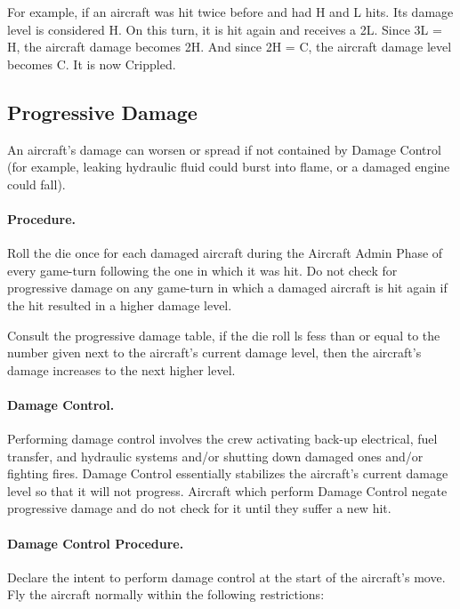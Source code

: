 For example, if an aircraft was hit twice before and had H and L hits. Its damage level is considered H. On this turn, it is hit again and receives a 2L. Since 3L = H, the aircraft damage becomes 2H. And since 2H = C, the aircraft damage level becomes C. It is now Crippled.


\advancedrules

\subsection{Progressive Damage}

An aircraft's damage can worsen or spread if not contained by Damage Control (for example, leaking hydraulic fluid could burst into flame, or a damaged engine could fall).

\paragraph{Procedure.} Roll the die once for each damaged aircraft during the Aircraft Admin Phase of every game-turn following the one in which it was hit. Do not check for progressive damage on any game-turn in which a damaged aircraft is hit again if the hit resulted in a higher damage level.

Consult the progressive damage table, if the die roll ls fess than or equal to the number given next to the aircraft's current damage level, then the aircraft's damage increases to the next higher level.

\paragraph{Damage Control.} Performing damage control involves the crew activating back-up electrical, fuel transfer, and hydraulic systems and/or shutting down damaged ones and/or fighting fires. Damage Control essentially stabilizes the aircraft's current damage level so that it will not progress. Aircraft which perform Damage Control negate progressive damage and do not check for it until they suffer a new hit.

\paragraph{Damage Control Procedure.} Declare the intent to perform damage control at the start of the aircraft's move. Fly the aircraft normally within the following restrictions:


